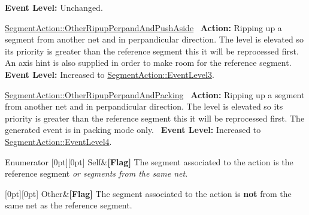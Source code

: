 \begin{DoxyItemize}
 {\bfseries Event Level\+:} Unchanged.
\item \hyperlink{classKite_1_1SegmentAction_a1d1cfd8ffb84e947f82999c682b666a7ad9caf9375b714a403e4af8a142cf9991}{Segment\+Action\+::\+Other\+Ripup\+Perpand\+And\+Push\+Aside}~\newline
 {\bfseries Action\+:} Ripping up a segment from another net and in perpandicular direction. The level is elevated so it\textquotesingle{}s priority is greater than the reference segment this it will be reprocessed first. An axis hint is also supplied in order to make room for the reference segment.~\newline
 {\bfseries Event Level\+:} Increased to \hyperlink{classKite_1_1SegmentAction_a1d1cfd8ffb84e947f82999c682b666a7a11ef388ea422168a9c79fd9b4d81ea34}{Segment\+Action\+::\+Event\+Level3}.
\item \hyperlink{classKite_1_1SegmentAction_a1d1cfd8ffb84e947f82999c682b666a7aed50f579a9e6b7ac698b2edf1a5da5c8}{Segment\+Action\+::\+Other\+Ripup\+Perpand\+And\+Packing}~\newline
 {\bfseries Action\+:} Ripping up a segment from another net and in perpandicular direction. The level is elevated so it\textquotesingle{}s priority is greater than the reference segment this it will be reprocessed first. The generated event is in packing mode only.~\newline
 {\bfseries Event Level\+:} Increased to \hyperlink{classKite_1_1SegmentAction_a1d1cfd8ffb84e947f82999c682b666a7ab8346062d5bbccb98893c4675b8d5098}{Segment\+Action\+::\+Event\+Level4}. 
\end{DoxyItemize}\begin{DoxyEnumFields}{Enumerator}
[0pt][0pt]{}\mbox{\label{classKite_1_1SegmentAction_a1d1cfd8ffb84e947f82999c682b666a7aacd3ef9d889b306ca7e7bdcd37ba659a}} 
Self&{\bfseries \mbox{[}Flag\mbox{]}} The segment associated to the action is the reference segment {\itshape or segments from the same net}. \\
\hline

[0pt][0pt]{}\mbox{\label{classKite_1_1SegmentAction_a1d1cfd8ffb84e947f82999c682b666a7a75f0c3176be2226dfe8ad164a0a034a2}} 
Other&{\bfseries \mbox{[}Flag\mbox{]}} The segment associated to the action is {\bfseries not} from the same net as the reference segment. \\
\hline


\end{DoxyEnumFields}

